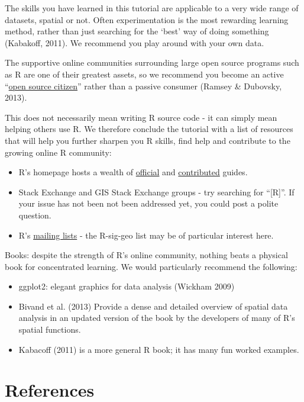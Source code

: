 \documentclass[]{article}
\begin{document}
The skills you have learned in this tutorial are applicable to a very
wide range of datasets, spatial or not. Often experimentation is the
most rewarding learning method, rather than just searching for the
`best' way of doing something (Kabakoff, 2011). We recommend you play
around with your own data.

The supportive online communities surrounding large open source programs
such as R are one of their greatest assets, so we recommend you become
an active
``\href{http://blog.cleverelephant.ca/2013/10/being-open-source-citizen.html}{open
source citizen}'' rather than a passive consumer (Ramsey \& Dubovsky,
2013).

This does not necessarily mean writing R source code - it can simply
mean helping others use R. We therefore conclude the tutorial with a
list of resources that will help you further sharpen you R skills, find
help and contribute to the growing online R community:

\begin{itemize}
\item
  R's homepage hosts a wealth of
  \href{http://cran.r-project.org/manuals.html}{official} and
  \href{http://cran.r-project.org/other-docs.html}{contributed} guides.
\item
  Stack Exchange and GIS Stack Exchange groups - try searching for
  ``{[}R{]}''. If your issue has not been not been addressed yet, you
  could post a polite question.
\item
  R's \href{http://www.r-project.org/mail.html}{mailing lists} - the
  R-sig-geo list may be of particular interest here.
\end{itemize}
Books: despite the strength of R's online community, nothing beats a
physical book for concentrated learning. We would particularly recommend
the following:

\begin{itemize}
\item
  ggplot2: elegant graphics for data analysis (Wickham 2009)
\item
  Bivand et al. (2013) Provide a dense and detailed overview of spatial
  data analysis in an updated version of the book by the developers of
  many of R's spatial functions.
\item
  Kabacoff (2011) is a more general R book; it has many fun worked
  examples.
\end{itemize}
\section{References}
\end{document}
